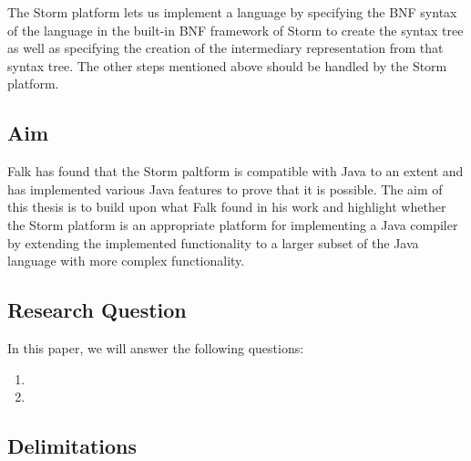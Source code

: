 \documentclass{sigchi}
\begin{document}
The Storm platform lets us implement a language by specifying the BNF syntax of the language in the built-in BNF framework of Storm to create the syntax tree as well as specifying the creation of the intermediary representation from that syntax tree. The other steps mentioned above should be handled by the Storm platform. 

\subsection{Aim}
%

Falk has found that the Storm paltform is compatible with Java to an extent and has implemented various Java features to prove that it is possible\cite{}. The aim of this thesis is to build upon what Falk found in his work and highlight whether the Storm platform is an appropriate platform for implementing a Java compiler by extending the implemented functionality to a larger subset of the Java language with more complex functionality.



\subsection{Research Question}
In this paper, we will answer the following questions:

\begin{enumerate}
\item 
\item 
\end{enumerate}

\subsection{Delimitations}
\end{document}
